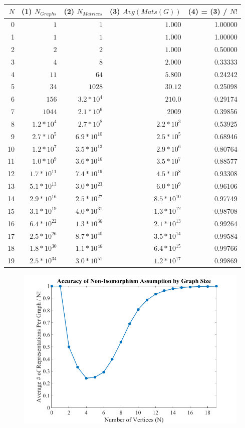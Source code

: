 \documentclass[a4paper,12pt]{article}
\begin{document}
\begin{tabular}{ r | r | r || r ||| r}
  \(N\) & (1) \(N_{Graphs}\) & (2) \(N_{Matrices}\) & (3) \(Avg(Mats(G))\) & (4) = (3) / \(N!\) \\
  \hline			
  0 & \(1\) & \(1\) & \(1.000\) & 1.00000 \\
  1 & \(1\) & \(1\) & \(1.000\) & 1.00000 \\
  2 & \(2\) & \(2\) & \(1.000\) & 0.50000 \\
  3 & \(4\) & \(8\) & \(2.000\) & 0.33333 \\
  4 & \(11\) & \(64\) & \(5.800\) & 0.24242 \\
  5 & \(34\) & \(1028\) & \(30.12\) & 0.25098 \\
  6 & \(156\) & \(3.2 * 10^4\) & \(210.0\) & 0.29174 \\
  7 & \(1044\) & \(2.1 * 10^6\) & \(2009\) & 0.39856 \\
  8 & \(1.2 * 10^{4}\) & \(2.7 * 10^{8}\) & \(2.2 * 10^{3}\) & 0.53925 \\
  9 & \(2.7 * 10^{5}\) & \(6.9 * 10^{10}\) & \(2.5 * 10^{5}\) & 0.68946 \\
  10 & \(1.2 * 10^{7}\) & \(3.5 * 10^{13}\) & \(2.9 * 10^{6}\) & 0.80764 \\
  11 & \(1.0 * 10^{9}\) & \(3.6 * 10^{16}\) & \(3.5 * 10^{7}\) & 0.88577 \\
  12 & \(1.7 * 10^{11}\) & \(7.4 * 10^{19}\) & \(4.5 * 10^{8}\) & 0.93308 \\
  13 & \(5.1 * 10^{13}\) & \(3.0 * 10^{23}\) & \(6.0 * 10^{9}\) & 0.96106 \\
  14 & \(2.9 * 10^{16}\) & \(2.5 * 10^{27}\) & \(8.5 * 10^{10}\) & 0.97749 \\
  15 & \(3.1 *10^{19}\) & \(4.0 * 10^{31}\) & \(1.3 * 10^{12}\) & 0.98708 \\
  16 & \(6.4 * 10^{22}\) & \(1.3 * 10^{36}\) & \(2.1 * 10^{13}\) & 0.99264 \\
  17 & \(2.5 * 10^{26}\) & \(8.7 * 10^{40}\) & \(3.5 * 10^{14}\) & 0.99584 \\
  18 & \(1.8 * 10^{30}\) & \(1.1 * 10^{46}\) & \(6.4 * 10^{15}\) & 0.99766 \\
  19 & \(2.5 * 10^{34}\) & \(3.0 * 10^{51}\) & \(1.2 * 10^{17}\) & 0.99869 \\
  \hline  
\end{tabular}

\begin{figure}[htbp]
  \centering
  \includegraphics[scale=.45]{accuracy-of-assumption}
\end{figure}
\end{document}
